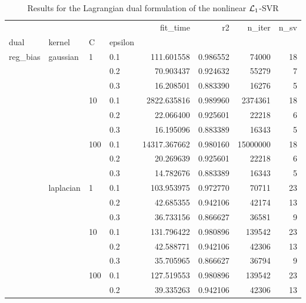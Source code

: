 \begin{table}[H]
\centering
\caption{Results for the Lagrangian dual formulation of the nonlinear $\protect \mathcal{L}_1$-SVR}
\label{nonlinear_lagrangian_dual_l1_svr_cv_results}
\begin{tabular}{llllrrrr}
\toprule
           &           &     &     &      fit\_time &        r2 &    n\_iter &  n\_sv \\
dual & kernel & C & epsilon &               &           &           &       \\
\midrule
reg\_bias & gaussian & 1   & 0.1 &    111.601558 &  0.986552 &     74000 &    18 \\
           &           &     & 0.2 &     70.903437 &  0.924632 &     55279 &     7 \\
           &           &     & 0.3 &     16.208501 &  0.883390 &     16276 &     5 \\
           &           & 10  & 0.1 &   2822.635816 &  0.989960 &   2374361 &    18 \\
           &           &     & 0.2 &     22.066400 &  0.925601 &     22218 &     6 \\
           &           &     & 0.3 &     16.195096 &  0.883389 &     16343 &     5 \\
           &           & 100 & 0.1 &  14317.367662 &  0.980160 &  15000000 &    18 \\
           &           &     & 0.2 &     20.269639 &  0.925601 &     22218 &     6 \\
           &           &     & 0.3 &     14.782676 &  0.883389 &     16343 &     5 \\
           & laplacian & 1   & 0.1 &    103.953975 &  0.972770 &     70711 &    23 \\
           &           &     & 0.2 &     42.685355 &  0.942106 &     42174 &    13 \\
           &           &     & 0.3 &     36.733156 &  0.866627 &     36581 &     9 \\
           &           & 10  & 0.1 &    131.796422 &  0.980896 &    139542 &    23 \\
           &           &     & 0.2 &     42.588771 &  0.942106 &     42306 &    13 \\
           &           &     & 0.3 &     35.705965 &  0.866627 &     36794 &     9 \\
           &           & 100 & 0.1 &    127.519553 &  0.980896 &    139542 &    23 \\
           &           &     & 0.2 &     39.335263 &  0.942106 &     42306 &    13 \\

\end{tabular}
\end{table}
